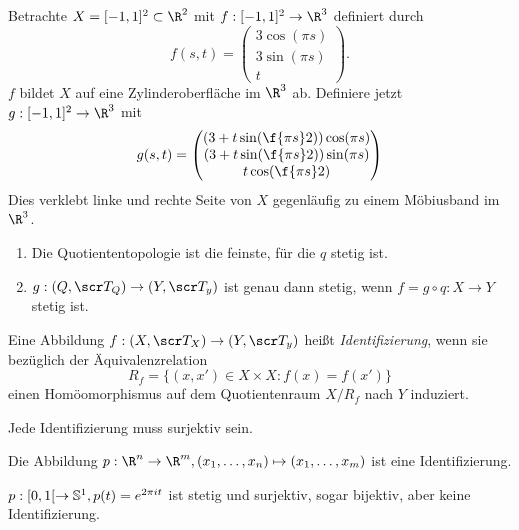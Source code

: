 \begin{ex}
	Betrachte $X = [-1,1]^2 \subset \R^2$ mit $f: [-1,1]^2 \to \R^3$ definiert durch
	\[
		f(s, t) = \begin{pmatrix}
			3 \cos(\pi s) \\
			3 \sin(\pi s) \\
			t
		\end{pmatrix}.
	\]
	$f$ bildet $X$ auf eine Zylinderoberfläche im $\R^3$ ab.
	Definiere jetzt $g: [-1,1]^2 \to \R^3$ mit
	\[
		g(s, t) = \begin{pmatrix}
			(3 + t \sin(\f{\pi s}2)) \cos (\pi s) \\
			(3 + t \sin(\f{\pi s}2)) \sin (\pi s) \\
			t \cos(\f {\pi s}2)
		\end{pmatrix}
	\]
	Dies verklebt linke und rechte Seite von $X$ gegenläufig zu einem Möbiusband im $\R^3$.
\end{ex}

\begin{st}
	\begin{enumerate}[(1)]
		\item
			Die Quotiententopologie ist die feinste, für die $q$ stetig ist.
		\item
			$g: (Q, \scr T_Q) \to (Y, \scr T_y)$ ist genau dann stetig, wenn $f = g \circ q: X \to Y$ stetig ist.
	\end{enumerate}
\end{st}

\begin{df}
	Eine Abbildung $f: (X, \scr T_X) \to (Y, \scr T_y)$ heißt \emph{Identifizierung}, wenn sie bezüglich der Äquivalenzrelation
	\[
		R_f = \big\{ (x,x') \in X \times X : f(x) = f(x') \big\}
	\]
	einen Homöomorphismus auf dem Quotientenraum $X / R_f$ nach $Y$ induziert.
	\begin{note}
		Jede Identifizierung muss surjektiv sein.
	\end{note}
\end{df}

\begin{ex}
	Die Abbildung $p: \R^n \to \R^m, (x_1, \dotsc, x_n) \mapsto (x_1, \dotsc, x_m)$ ist eine Identifizierung.
\end{ex}

\begin{ex}
	$p: [0,1[ \to \S^1, p(t) = e^{2\pi i t}$ ist stetig und surjektiv, sogar bijektiv, aber keine Identifizierung.
\end{ex}

